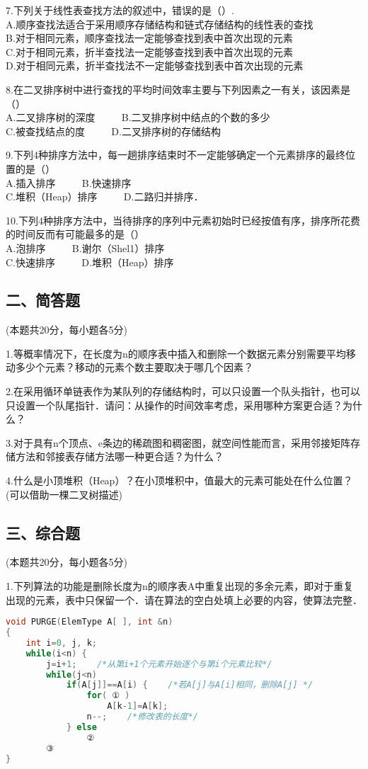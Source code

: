 7.下列关于线性表查找方法的叙述中，错误的是（）. \\
A.顺序查找法适合于采用顺序存储结构和链式存储结构的线性表的查找 \\
B.对于相同元素，顺序查找法一定能够查找到表中首次出现的元素 \\
C.对于相同元素，折半查找法一定能够查找到表中首次出现的元素 \\
D.对于相同元素，折半查找法不一定能够查找到表中首次出现的元素

8.在二叉排序树中进行查找的平均时间效率主要与下列因素之一有关，该因素是（） \\
A.二叉排序树的深度 $\qquad$ B.二叉排序树中结点的个数的多少 \\
C.被查找结点的度 $\qquad$ D.二叉排序树的存储结构

9.下列4种排序方法中，每一趟排序结束时不一定能够确定一个元素排序的最终位置的是（） \\
A.插入排序 $\qquad$ B.快速排序 \\
C.堆积（Heap）排序 $\qquad$ D.二路归并排序．

10.下列4种排序方法中，当待排序的序列中元素初始时已经按值有序，排序所花费的时间反而有可能最多的是（） \\
A.泡排序 $\qquad$ B.谢尔（Shel1）排序 \\
C.快速排序 $\qquad$ D.堆积（Heap）排序

\subsection{二、简答题}
(本题共20分，每小题各5分)

1.等概率情况下，在长度为n的顺序表中插入和删除一个数据元素分别需要平均移动多少个元素？移动的元素个数主要取决于哪几个因素？

2.在采用循环单链表作为某队列的存储结构时，可以只设置一个队头指针，也可以只设置一个队尾指针．请问：从操作的时间效率考虑，采用哪种方案更合适？为什么？

3.对于具有n个顶点、e条边的稀疏图和稠密图，就空间性能而言，采用邻接矩阵存储方法和邻接表存储方法哪一种更合适？为什么？

4.什么是小顶堆积（Heap）？在小顶堆积中，值最大的元素可能处在什么位置？ (可以借助一棵二叉树描述)

\subsection{三、综合题}
(本题共20分，每小题各5分)

1.下列算法的功能是删除长度为n的顺序表A中重复出现的多余元素，即对于重复出现的元素，表中只保留一个．请在算法的空白处填上必要的内容，使算法完整．
\begin{lstlisting}[language=cpp]
void PURGE(ElemType A[ ], int &n)
{
    int i=0, j, k;
    while(i<n) {
        j=i+1;    /*从第i+1个元素开始逐个与第i个元素比较*/
        while(j<n)
            if(A[j]]==A[i) {    /*若A[j]与A[i]相同，删除A[j] */
                for( ① )
                    A[k-1]=A[k];
                n--;    /*修改表的长度*/
            } else
                ②
        ③
}
\end{lstlisting}

